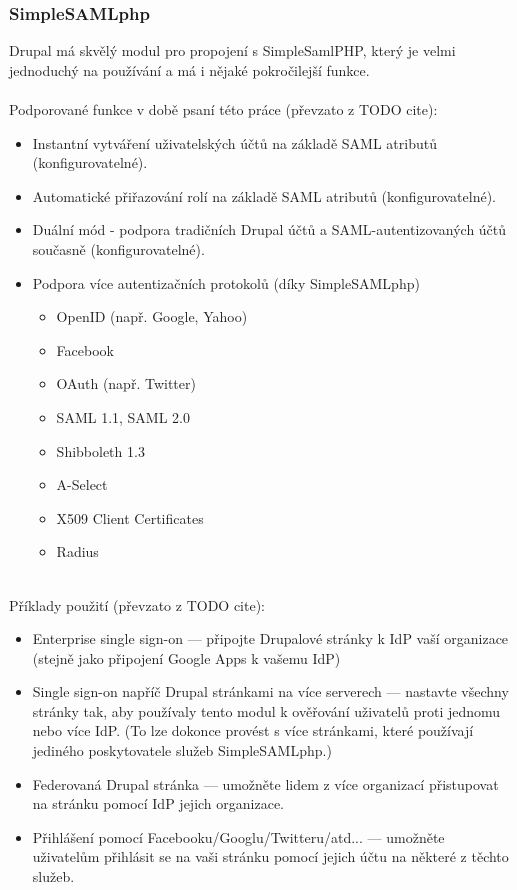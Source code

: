 \subsubsection{SimpleSAMLphp} %
    Drupal má skvělý modul pro propojení s SimpleSamlPHP, který je velmi jednoduchý na používání a má i nějaké pokročilejší funkce.
\\ 
\\
     Podporované funkce v době psaní této práce (převzato z TODO cite):
    \begin{itemize}
        \item Instantní vytváření uživatelských účtů na základě SAML atributů (konfigurovatelné).
        \item Automatické přiřazování rolí na základě SAML atributů (konfigurovatelné).
        \item Duální mód - podpora tradičních Drupal účtů a SAML-autentizovaných účtů současně (konfigurovatelné).
        \item  Podpora více autentizačních protokolů (díky SimpleSAMLphp)
        \begin{itemize}
            \item OpenID (např. Google, Yahoo)
            \item Facebook
            \item OAuth (např. Twitter)
            \item SAML 1.1, SAML 2.0
            \item Shibboleth 1.3
            \item A-Select
            \item X509 Client Certificates
            \item Radius
        \end{itemize}
    \end{itemize}
    \\
    Příklady použití (převzato z TODO cite):
    \begin{itemize}
        \item Enterprise single sign-on --- připojte Drupalové stránky k IdP vaší organizace (stejně jako připojení Google Apps k vašemu IdP)
        \item Single sign-on napříč Drupal stránkami na více serverech --- nastavte všechny stránky tak, aby používaly tento modul k ověřování uživatelů proti jednomu nebo více IdP. (To lze dokonce provést s více stránkami, které používají jediného poskytovatele služeb SimpleSAMLphp.)
        \item Federovaná Drupal stránka --- umožněte lidem z více organizací přistupovat na stránku pomocí IdP jejich organizace.
        \item Přihlášení pomocí Facebooku/Googlu/Twitteru/atd... --- umožněte uživatelům přihlásit se na vaši stránku pomocí jejich účtu na některé z těchto služeb.
    \end{itemize}
    
